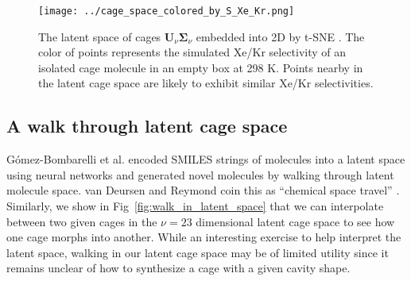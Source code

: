 \documentclass[journal=jacsat,manuscript=article,layout=traditional]{achemso}
\begin{document}
\begin{figure}
\centering
	\texttt{[image: ../cage\_space\_colored\_by\_S\_Xe\_Kr.png]}
	\caption{The latent space of cages $\mathbf{U}_\nu \mathbf{\Sigma}_\nu$ embedded into 2D by t-SNE \cite{maaten2008visualizing,wattenberg2016how}. The color of points represents the simulated Xe/Kr selectivity of an isolated cage molecule in an empty box at 298 K. Points nearby in the latent cage space are likely to exhibit similar Xe/Kr selectivities.
	} \label{fig:latent_space_S_Xe_Kr}
\end{figure}

\subsection{A walk through latent cage space}
G\'{o}mez-Bombarelli et al. \cite{gomez2018automatic} encoded SMILES strings of molecules into a latent space using neural networks and generated novel molecules by walking through latent molecule space. van Deursen and Reymond coin this as ``chemical space travel'' \cite{van2007chemical}. Similarly, we show in Fig~\ref{fig:walk_in_latent_space} that we can interpolate between two given cages in the $\nu=23$ dimensional latent cage space to see how one cage morphs into another.
While an interesting exercise to help interpret the latent space, walking in our latent cage space may be of limited utility since it remains unclear of how to synthesize a cage with a given cavity shape.
\end{document}
